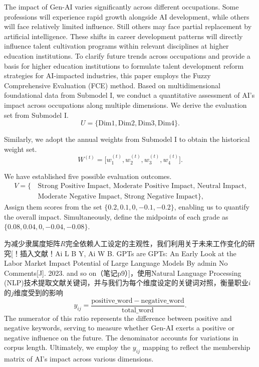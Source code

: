 \documentclass{mcmthesis}
\begin{document}
The impact of Gen-AI varies significantly across different occupations. Some professions will experience rapid growth alongside AI development, while others will face relatively limited influence. Still others may face partial replacement by artificial intelligence. These shifts in career development patterns will directly influence talent cultivation programs within relevant disciplines at higher education institutions. To clarify future trends across occupations and provide a basis for higher education institutions to formulate talent development reform strategies for AI-impacted industries, this paper employs the Fuzzy Comprehensive Evaluation (FCE) method. Based on multidimensional foundational data from Submodel I, we conduct a quantitative assessment of AI's impact across occupations along multiple dimensions. We derive the evaluation set from Submodel I.
\begin{equation} 
U=\{\mathrm{Dim1},\mathrm{Dim2},\mathrm{Dim3},\mathrm{Dim4}\}.
\end{equation}

Similarly, we adopt the annual weights from Submodel I to obtain the historical weight set.
\begin{equation} 
W^{(t)}=\big[w_1^{(t)}, w_2^{(t)}, w_3^{(t)}, w_4^{(t)}] .
\end{equation}

We have established five possible evaluation outcomes.
\begin{equation} 
\begin{aligned}
V=\{\,&\text{Strong Positive Impact, Moderate Positive Impact, Neutral Impact,} \\
&\text{Moderate Negative Impact, Strong Negative Impact}\},
\end{aligned}
\end{equation}
Assign them scores from the set $\{0.2, 0.1, 0, -0.1, -0.2\}$, enabling us to quantify the overall impact. Simultaneously, define the midpoints of each grade as $\{0.08, 0.04, 0, -0.04, -0.08 \}$.

为减少隶属度矩阵$R$完全依赖人工设定的主观性，我们利用关于未来工作变化的研究\cite{FreyOsborne2017,McKinseyGenAIPotential,NBERWorkplaceGenAI,OECDEmploymentOutlook2023,OECDThreeDrivers}[！插入文献！Ai L B Y, Ai W B. GPTs are GPTs: An Early Look at the Labor Market Impact Potential of Large Language Models By admin No Comments[J]. 2023. and so on（笔记p9）]，使用Natural Language Processing (NLP)技术提取文献关键词，并与我们为每个维度设定的关键词对照，衡量职业$i$的$j$维度受到的影响
\begin{equation} 
y_{ij}=\frac{\mathrm{positive\_word}-\mathrm{negative\_word}}{\mathrm{total\_word}}.
\end{equation}
The numerator of this ratio represents the difference between positive and negative keywords, serving to measure whether Gen-AI exerts a positive or negative influence on the future. The denominator accounts for variations in corpus length. Ultimately, we employ the $y_{ij}$ mapping to reflect the membership matrix of AI's impact across various dimensions.
\end{document}
